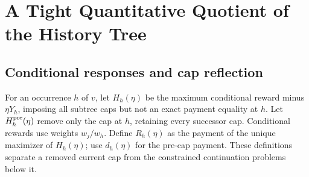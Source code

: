 \section{A Tight Quantitative Quotient of the History Tree}\label{sec:quotient}
\subsection{Conditional responses and cap reflection}
For an occurrence $h$ of $v$, let $H_h(\eta)$ be the maximum conditional reward minus $\eta Y_h$, imposing all subtree caps but not an exact payment equality at $h$. Let $H_h^{\rm pre}(\eta)$ remove only the cap at $h$, retaining every successor cap. Conditional rewards use weights $w_j/w_h$. Define $R_h(\eta)$ as the payment of the unique maximizer of $H_h(\eta)$; use $d_h(\eta)$ for the pre-cap payment. These definitions separate a removed current cap from the constrained continuation problems below it.

